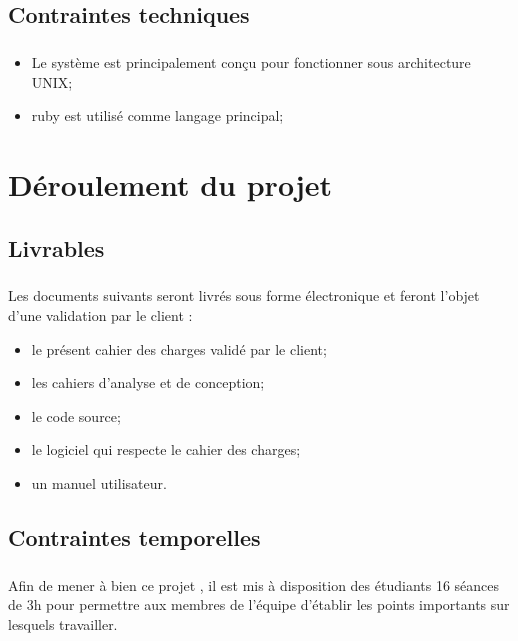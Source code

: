 \section{Contraintes techniques}
	\paragraph*{}
	\begin{itemize}
		\item Le système est principalement conçu pour fonctionner sous architecture UNIX;%
		\item ruby est utilisé comme langage principal;
	\end{itemize}




\chapter{Déroulement du projet}


\section {Livrables}
	\paragraph*{}
	Les documents suivants seront livrés sous forme électronique et feront l'objet d'une validation par le client :
	\begin{itemize}
		\item le présent cahier des charges validé par le client;
		\item les cahiers d'analyse et de conception;
		\item le code source;
		\item le logiciel qui respecte le cahier des charges;
		\item un manuel utilisateur.
	\end{itemize}


\section{Contraintes temporelles}
	\paragraph*{}
	Afin de mener à bien ce projet , il est mis à disposition des étudiants 16 séances de 3h pour permettre aux membres de l'équipe d'établir les points importants sur lesquels travailler.
